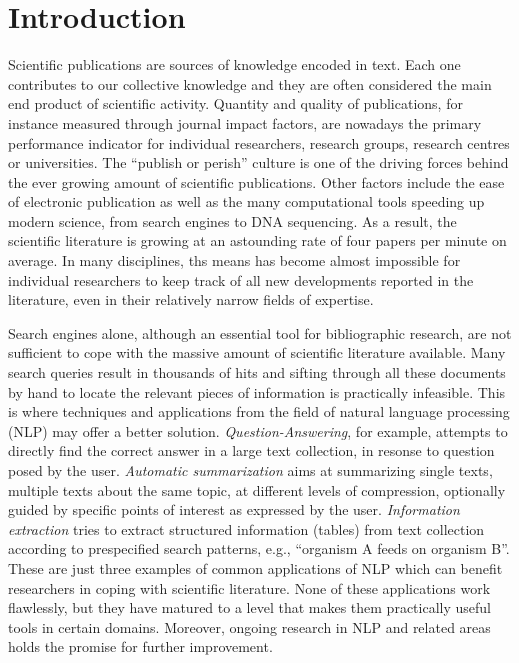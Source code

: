 
\chapter{Introduction}

Scientific publications are sources of knowledge encoded in text.
Each one contributes to our collective knowledge and they are often considered the main end product of scientific activity.
Quantity and quality of publications, for instance measured through journal impact factors, are nowadays the primary performance indicator for individual researchers, research groups, research centres or universities.  
The ``publish or perish'' culture is one of the driving forces behind the ever growing amount of scientific publications.
Other factors include the ease of electronic publication as well as the many computational tools speeding up modern science, from search engines to DNA sequencing.
As a result, the scientific literature is growing at an astounding rate of four papers per minute on average.
In many disciplines, ths means has become almost impossible for individual researchers to keep track of all new developments reported in the literature, even in their relatively narrow fields of expertise.

Search engines alone, although an essential tool for bibliographic research, are not sufficient to cope with the massive amount of scientific literature available.
Many search queries result in thousands of hits and sifting through all these documents by hand to locate the relevant pieces of information is practically infeasible.
This is where techniques and applications from the field of natural language processing (NLP) may offer a better solution.
\emph{Question-Answering}, for example, attempts to directly find the correct answer in a large text collection, in resonse to question posed by the user.
\emph{Automatic summarization} aims at summarizing single texts, multiple texts about the same topic, at different levels of compression, optionally guided by specific points of interest as expressed by the user.
\emph{Information extraction} tries to extract structured information (tables) from text collection according to prespecified search patterns, e.g., ``organism A feeds on organism B''.
These are just three examples of common applications of NLP which can benefit researchers in coping with scientific literature.
None of these applications work flawlessly, but they have matured to a level that makes them practically useful tools in certain domains.
Moreover, ongoing research in NLP and related areas holds the promise for further improvement.     
  
